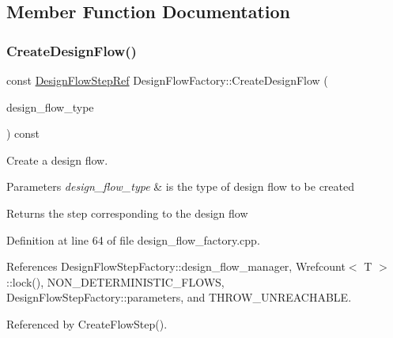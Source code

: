 \subsection{Member Function Documentation}
\mbox{\label{classDesignFlowFactory_af22b8c314d4b1ea742ab2527a98bc1de}} 
\subsubsection{\texorpdfstring{Create\+Design\+Flow()}{CreateDesignFlow()}}
{\footnotesize\ttfamily const \hyperlink{design__flow__step_8hpp_a9dd6b4474ddf52d41a78b1aaa12ae6c8}{Design\+Flow\+Step\+Ref} Design\+Flow\+Factory\+::\+Create\+Design\+Flow (\begin{DoxyParamCaption}\item[{const \hyperlink{design__flow_8hpp_a0701ad2cbf08dc97b38caee3bbbff0c0}{Design\+Flow\+\_\+\+Type}}]{design\+\_\+flow\+\_\+type }\end{DoxyParamCaption}) const}



Create a design flow. 


\begin{DoxyParams}{Parameters}
{\em design\+\_\+flow\+\_\+type} & is the type of design flow to be created \\
\hline
\end{DoxyParams}
\begin{DoxyReturn}{Returns}
the step corresponding to the design flow 
\end{DoxyReturn}


Definition at line 64 of file design\+\_\+flow\+\_\+factory.\+cpp.



References Design\+Flow\+Step\+Factory\+::design\+\_\+flow\+\_\+manager, Wrefcount$<$ T $>$\+::lock(), N\+O\+N\+\_\+\+D\+E\+T\+E\+R\+M\+I\+N\+I\+S\+T\+I\+C\+\_\+\+F\+L\+O\+WS, Design\+Flow\+Step\+Factory\+::parameters, and T\+H\+R\+O\+W\+\_\+\+U\+N\+R\+E\+A\+C\+H\+A\+B\+LE.



Referenced by Create\+Flow\+Step().


